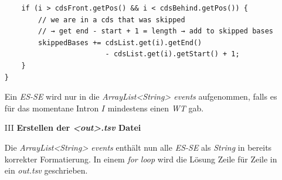 \documentclass[12pt]{article}
\begin{document}
\begin{enumerate}
\begin{verbatim}
    if (i > cdsFront.getPos() && i < cdsBehind.getPos()) {
        // we are in a cds that was skipped
        // → get end - start + 1 = length → add to skipped bases
        skippedBases += cdsList.get(i).getEnd() 
                        - cdsList.get(i).getStart() + 1;
    }
}
    \end{verbatim}
    Ein \textit{ES-SE} wird nur in die \textit{ArrayList<String> events} aufgenommen, falls es für das momentane
    Intron $I$ mindestens einen \textit{WT} gab.

    \item[III] \textbf{Erstellen der \textit{<out>.tsv} Datei}

    Die \textit{ArrayList<String> events} enthält nun alle \textit{ES-SE} als \textit{String} in bereits
    korrekter Formatierung. In einem \textit{for loop} wird die Lösung Zeile für Zeile in ein \textit{out.tsv}
    geschrieben.
\end{enumerate}
\newpage
\end{document}

